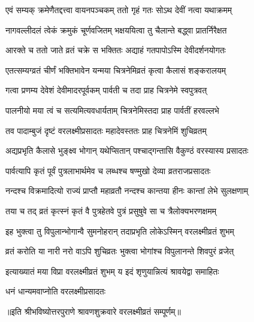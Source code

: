 \twolineshloka
{एवं सम्यक् क्रमेणैतद्दत्त्वा वायनपञ्चकम्}
{ततो गृहं गतः सोऽथ देवीं नत्वा यथाक्रमम्}%


\twolineshloka
{नागवल्लीदलं त्वेकं क्रमुकं चूर्णवजितम्}
{भक्षययित्वा तु चैलान्ते बद्ध्वा प्रातर्निरैक्षत}%


\twolineshloka
{आरक्ते च ततो जाते व्रतं चक्रे स भक्तितः}
{अद्याहं गतपापोऽस्मि देवीदर्शनयोगतः}%


\twolineshloka
{एतत्सम्यग्व्रतं चीर्णं भक्तिभावेन यन्मया}
{चित्रनेमिव्रतं कृत्वा कैलासं शङ्करालयम्}%


\twolineshloka
{गत्वा प्रणम्य देवेशं देवीमादरपूर्वकम्}
{पार्वती च तदा प्राह चित्रनेमे स्वपुत्रवत्}%


\twolineshloka
{पालनीयो मया त्वं च सत्यमित्यवधार्यताम्}
{चित्रनेमिस्तदा प्राह पार्वतीं हरवल्लभे}%


\twolineshloka
{तव पादाम्बुजं दृष्टं वरलक्ष्मीप्रसादतः}
{महादेवस्ततः प्राह चित्रनेमिं शुचिव्रतम्}%


\twolineshloka
{अद्यप्रभृति कैलासे भुङ्क्ष्व भोगान् यथेप्सितान्}
{पश्चाद्गन्तासि वैकुण्ठं वरस्यास्य प्रसादतः}%


\twolineshloka
{पार्वत्यापि कृतं पूर्वं पुत्रलाभार्थमेव च}
{लब्धश्च षण्मुखो देव्या व्रतराजप्रसादतः}%


\twolineshloka
{नन्दश्च विक्रमादित्यो राज्यं प्राप्तौ महाव्रतौ}
{नन्दश्च कान्तया हीनः कान्तां लेभे सुलक्षणाम्}%


\twolineshloka
{तया च तद् व्रतं कृत्स्नं कृतं वै पुत्रहेतवे}
{पुत्रं प्रसुषुवे सा च त्रैलोक्यभरणक्षमम्}%


\twolineshloka
{इह भुक्त्वा तु विपुलान्भोगान्वै सुमनोहरान्}
{तदाप्रभृति लोकेऽस्मिन् वरलक्ष्मीव्रतं शुभम्}%


\twolineshloka
{व्रतं करोति या नारी नरो वाऽपि शुचिव्रतः}
{भुक्त्वा भोगांश्च विपुलानन्ते शिवपुरं व्रजेत्}%


\twolineshloka
{इत्याख्यातं मया विप्रा वरलक्ष्मीव्रतं शुभम्}
{य इदं शृणुयान्नित्यं श्रावयेद्वा समाहितः}%

\onelineshloka
{धनं धान्यमवाप्नोति वरलक्ष्मीप्रसादतः}%

॥इति श्रीभविष्योत्तरपुराणे श्रावणशुक्रवारे वरलक्ष्मीव्रतं सम्पूर्णम्॥